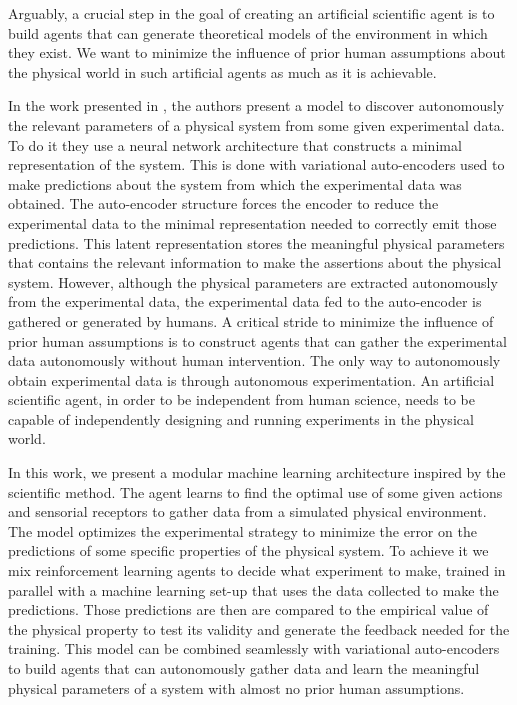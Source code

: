 \documentclass[11pt,a4paper,twoside]{report}
\newcommand{\+}{\textnormal{+} }
\theoremstyle{definition}
\numberwithin{equation}{chapter}
\begin{document}
Arguably, a crucial step in the goal of creating an artificial scientific agent
is to build agents that can generate theoretical models of the environment in
which they exist. We want to minimize the influence of prior human assumptions
about the physical world in such artificial agents as much as it is achievable.
\par In the work presented in \cite{iten2020discovering}, the authors present a
model to discover autonomously the relevant parameters of a physical system from
some given experimental data. To do it they use a neural network architecture
that constructs a minimal representation of the system. This is done with
variational auto-encoders used to make predictions about the system from which
the experimental data was obtained. The auto-encoder structure forces the
encoder to reduce the experimental data to the minimal representation needed to
correctly emit those predictions. This latent representation stores the
meaningful physical parameters that contains the relevant information to make
the assertions about the physical system. However, although the physical
parameters are extracted autonomously from the experimental data, the
experimental data fed to the auto-encoder is gathered or generated by humans. A
critical stride to minimize the influence of prior human assumptions is to
construct agents that can gather the experimental data autonomously without
human intervention. The only way to autonomously obtain experimental data is
through autonomous experimentation. An artificial scientific agent, in order to
be independent from human science, needs to be capable of independently
designing and running experiments in the physical world.

\par In this work, we present a modular machine learning architecture inspired
by the scientific method. The agent learns to find the optimal use of some given
actions and sensorial receptors to gather data from a simulated physical
environment. The model optimizes the experimental strategy to minimize the error
on the predictions of some specific properties of the physical system. To
achieve it we mix reinforcement learning agents to decide what experiment to
make, trained in parallel with a machine learning set-up that uses the data
collected to make the predictions. Those predictions are then are compared to
the empirical value of the physical property to test its validity and generate
the feedback needed for the training. This model can be combined seamlessly with
variational auto-encoders to build agents that can autonomously gather data and
learn the meaningful physical parameters of a system with almost no prior human
assumptions.
\end{document}

